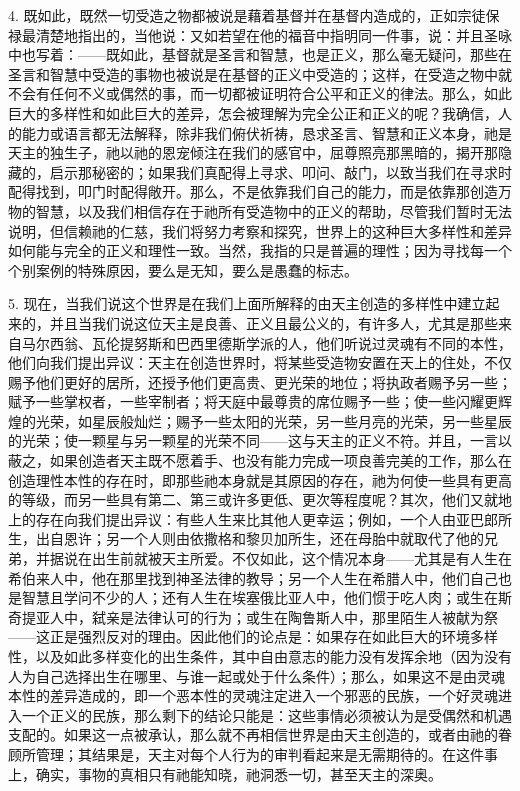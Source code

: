 4. 既如此，既然一切受造之物都被说是藉着基督并在基督内造成的，正如宗徒保禄最清楚地指出的，当他说：又如若望在他的福音中指明同一件事，说：并且圣咏中也写着：——既如此，基督就是圣言和智慧，也是正义，那么毫无疑问，那些在圣言和智慧中受造的事物也被说是在基督的正义中受造的；这样，在受造之物中就不会有任何不义或偶然的事，而一切都被证明符合公平和正义的律法。那么，如此巨大的多样性和如此巨大的差异，怎会被理解为完全公正和正义的呢？我确信，人的能力或语言都无法解释，除非我们俯伏祈祷，恳求圣言、智慧和正义本身，祂是天主的独生子，祂以祂的恩宠倾注在我们的感官中，屈尊照亮那黑暗的，揭开那隐藏的，启示那秘密的；如果我们真配得上寻求、叩问、敲门，以致当我们在寻求时配得找到，叩门时配得敞开。那么，不是依靠我们自己的能力，而是依靠那创造万物的智慧，以及我们相信存在于祂所有受造物中的正义的帮助，尽管我们暂时无法说明，但信赖祂的仁慈，我们将努力考察和探究，世界上的这种巨大多样性和差异如何能与完全的正义和理性一致。当然，我指的只是普遍的理性；因为寻找每一个个别案例的特殊原因，要么是无知，要么是愚蠢的标志。\par

5. 现在，当我们说这个世界是在我们上面所解释的由天主创造的多样性中建立起来的，并且当我们说这位天主是良善、正义且最公义的，有许多人，尤其是那些来自马尔西翁、瓦伦提努斯和巴西里德斯学派的人，他们听说过灵魂有不同的本性，他们向我们提出异议：天主在创造世界时，将某些受造物安置在天上的住处，不仅赐予他们更好的居所，还授予他们更高贵、更光荣的地位；将执政者赐予另一些；赋予一些掌权者，一些宰制者；将天庭中最尊贵的席位赐予一些；使一些闪耀更辉煌的光荣，如星辰般灿烂；赐予一些太阳的光荣，另一些月亮的光荣，另一些星辰的光荣；使一颗星与另一颗星的光荣不同——这与天主的正义不符。并且，一言以蔽之，如果创造者天主既不愿着手、也没有能力完成一项良善完美的工作，那么在创造理性本性的存在时，即那些祂本身就是其原因的存在，祂为何使一些具有更高的等级，而另一些具有第二、第三或许多更低、更次等程度呢？其次，他们又就地上的存在向我们提出异议：有些人生来比其他人更幸运；例如，一个人由亚巴郎所生，出自恩许；另一个人则由依撒格和黎贝加所生，还在母胎中就取代了他的兄弟，并据说在出生前就被天主所爱。不仅如此，这个情况本身——尤其是有人生在希伯来人中，他在那里找到神圣法律的教导；另一个人生在希腊人中，他们自己也是智慧且学问不少的人；还有人生在埃塞俄比亚人中，他们惯于吃人肉；或生在斯奇提亚人中，弑亲是法律认可的行为；或生在陶鲁斯人中，那里陌生人被献为祭——这正是强烈反对的理由。因此他们的论点是：如果存在如此巨大的环境多样性，以及如此多样变化的出生条件，其中自由意志的能力没有发挥余地（因为没有人为自己选择出生在哪里、与谁一起或处于什么条件）；那么，如果这不是由灵魂本性的差异造成的，即一个恶本性的灵魂注定进入一个邪恶的民族，一个好灵魂进入一个正义的民族，那么剩下的结论只能是：这些事情必须被认为是受偶然和机遇支配的。如果这一点被承认，那么就不再相信世界是由天主创造的，或者由祂的眷顾所管理；其结果是，天主对每个人行为的审判看起来是无需期待的。在这件事上，确实，事物的真相只有祂能知晓，祂洞悉一切，甚至天主的深奥。\par


